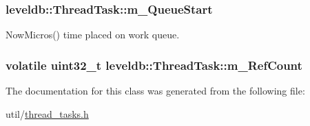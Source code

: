 \subsubsection[{m\+\_\+\+Queue\+Start}]{ leveldb\+::\+Thread\+Task\+::m\+\_\+\+Queue\+Start}\label{classleveldb_1_1_thread_task_ad8bd1c18e4dca18b192dab8574b408c4}


Now\+Micros() time placed on work queue. 

\hypertarget{classleveldb_1_1_thread_task_aa5ae24ffb26e826b411ef1f452004201}{}
\subsubsection[{m\+\_\+\+Ref\+Count}]{\setlength{\rightskip}{0pt plus 5cm}volatile {\bf uint32\+\_\+t} leveldb\+::\+Thread\+Task\+::m\+\_\+\+Ref\+Count\hspace{0.3cm}{\ttfamily [protected]}}\label{classleveldb_1_1_thread_task_aa5ae24ffb26e826b411ef1f452004201}


The documentation for this class was generated from the following file\+:\begin{DoxyCompactItemize}
\item 
util/\hyperlink{thread__tasks_8h}{thread\+\_\+tasks.\+h}\end{DoxyCompactItemize}
